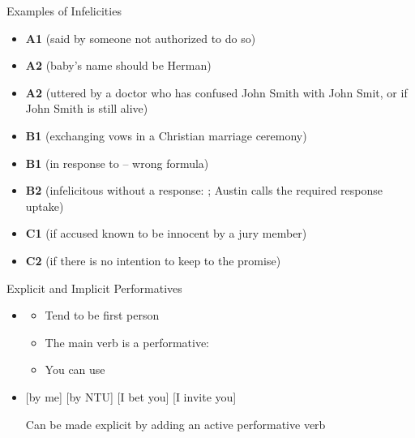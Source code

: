 \documentclass{beamer}
\begin{document}
\begin{frame}{Examples of Infelicities}
\begin{itemize} 
\item \textbf{A1}  (said by someone not authorized to do so)
\item \textbf{A2}  (baby's name should
  be Herman)
\item \textbf{A2}  (uttered by a doctor who has confused John Smith
with John Smit, or if John Smith is still alive)
\item \textbf{B1}
 (exchanging vows in a Christian marriage ceremony)
\item \textbf{B1}
 (in response to  – wrong formula)
\item \textbf{B2}
 (infelicitous without a response: ; Austin calls the required response uptake)
\item \textbf{C1}
 (if accused known to be innocent by a jury member)
\item \textbf{C2}
 (if there is no intention to keep to the promise)
\end{itemize}


\end{frame}

\begin{frame}{Explicit and Implicit Performatives}
\begin{itemize}
\item {}
  \begin{itemize}
  \item Tend to be first person
  \item The main verb  is a performative: 
  \item You can use 
  \end{itemize}
\item {}
  \begin{exe}
    \ex {} [by me]
    \ex {} [by NTU]
    \ex {} [I bet you] 
    \ex {} [I invite you]
  \end{exe}
  Can be made explicit by adding an active performative verb
\end{itemize}

 \end{frame}
\end{document}
